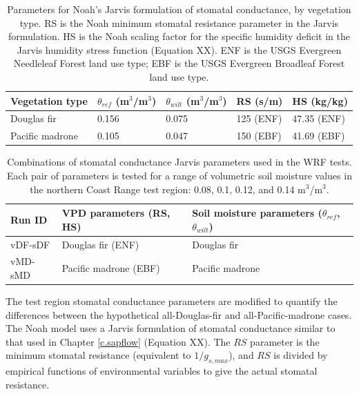 \begin{table}
\begin{tabular}{ l p{3cm} p{3cm} p{2cm} p{3cm} }
\hline
Vegetation type & $\theta_{ref}$ (m$^3$/m$^3$) & $\theta_{wilt}$ (m$^3$/m$^3$) & RS (s/m) & HS (kg/kg)\\ \hline
Douglas fir & 0.156 & 0.075 & 125 (ENF) & 47.35 (ENF)\\
Pacific madrone & 0.105 & 0.047 & 150 (EBF) & 41.69 (EBF)\\
\hline
\end{tabular}
\caption{Parameters for Noah's Jarvis formulation of stomatal conductance, by vegetation type.  RS is the Noah minimum stomatal resistance parameter in the Jarvis formulation. HS is the Noah scaling factor for the specific humidity deficit in the Jarvis humidity stress function (Equation XX).  ENF is the USGS Evergreen Needleleaf Forest land use type; EBF is the USGS Evergreen Broadleaf Forest land use type.}
\label{table:BL_NoahJarvisparams}
\end{table}

\begin{table}
\begin{tabular}{ l p{6cm} p{7cm} }
\hline
Run ID & VPD parameters (RS, HS) & Soil moisture parameters ($\theta_{ref}$, $\theta_{wilt}$)\\ \hline
vDF-sDF & Douglas fir (ENF) & Douglas fir\\
vMD-sMD & Pacific madrone (EBF) & Pacific madrone\\
\hline
\end{tabular}
\caption{Combinations of stomatal conductance Jarvis parameters used in the WRF tests.  Each pair of parameters is tested for a range of volumetric soil moisture values in the northern Coast Range test region: 0.08, 0.1, 0.12, and 0.14 m$^3$/m$^3$.}
\label{table:BL_WRFruns}
\end{table}

The test region stomatal conductance parameters are modified to quantify the differences between the hypothetical all-Douglas-fir and all-Pacific-madrone cases.  The Noah model uses a Jarvis formulation of stomatal conductance similar to that used in Chapter \ref{c.sapflow} (Equation XX).  The $RS$ parameter is the minimum stomatal resistance (equivalent to $1/g_{s,max}$), and $RS$ is divided by empirical functions of environmental variables to give the actual stomatal resistance.  

